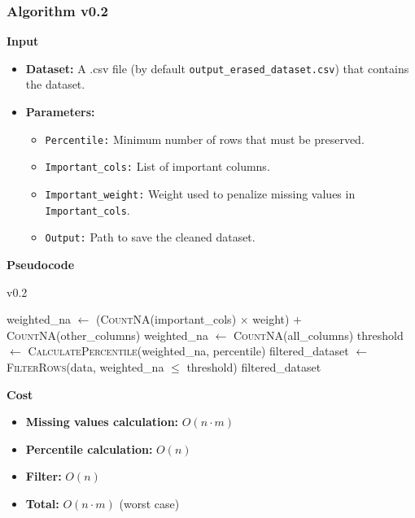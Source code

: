 \documentclass[a4paper,12pt]{article}
\begin{document}
\subsubsection{Algorithm v0.2}
\textbf{Input}
\begin{itemize}
    \item \textbf{Dataset:} A .csv file (by default \texttt{output\_erased\_dataset.csv}) that contains the dataset.
    \item \textbf{Parameters:}
    \begin{itemize}
        \item \texttt{Percentile:} Minimum number of rows that must be preserved.
        \item \texttt{Important\_cols:} List of important columns.
        \item \texttt{Important\_weight:} Weight used to penalize missing values in \texttt{Important\_cols}.
        \item \texttt{Output:} Path to save the cleaned dataset.
    \end{itemize}
\end{itemize}



\textbf{Pseudocode}
\begin{algorithm}[H]
\caption{v0.2}
\begin{algorithmic}[1]
            \State weighted\_na $\gets$ (\textsc{CountNA}(important\_cols) $\times$ weight) $+$ \textsc{CountNA}(other\_columns)
        \Else
            \State weighted\_na $\gets$ \textsc{CountNA}(all\_columns)
        \EndIf
    \EndFor
    \State threshold $\gets$ \textsc{CalculatePercentile}(weighted\_na, percentile)
    \State filtered\_dataset $\gets$ \textsc{FilterRows}(data, weighted\_na $\leq$ threshold)
    \State \Return filtered\_dataset
\EndFunction
\end{algorithmic}
\end{algorithm}
\textbf{Cost}
\begin{itemize}
    \item \textbf{Missing values calculation:} $O(n \cdot m)$ 
    \item \textbf{Percentile calculation:} $O(n)$
    \item \textbf{Filter:} $O(n)$
    \item \textbf{Total:} $O(n \cdot m)$ (worst case)
\end{itemize}
\end{document}
